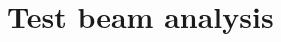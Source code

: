 \setcounter{chapter}{2}
\setcounter{section}{0}

\graphicspath{ {./chapters/2_test_beam/figures/} }

\chapter{Test beam analysis}
